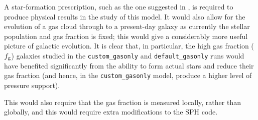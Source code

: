 A star-formation prescription, such as the one suggested in \citet{tasker_simulating_2006}, is required to produce physical results in the study of this model.
It would also allow for the evolution of a gas cloud through to a present-day galaxy as currently the stellar population and gas fraction is fixed; this would give a considerably more useful picture of galactic evolution.
It is clear that, in particular, the high gas fraction ($f_\mathrm{g}$) galaxies studied in the {\tt custom\_gasonly} and {\tt default\_gasonly} runs would have benefited significantly from the ability to form actual stars and reduce their gas fraction (and hence, in the {\tt custom\_gasonly} model, produce a higher level of pressure support).

This would also require that the gas fraction is measured locally, rather than globally, and this would require extra modifications to the SPH code.
